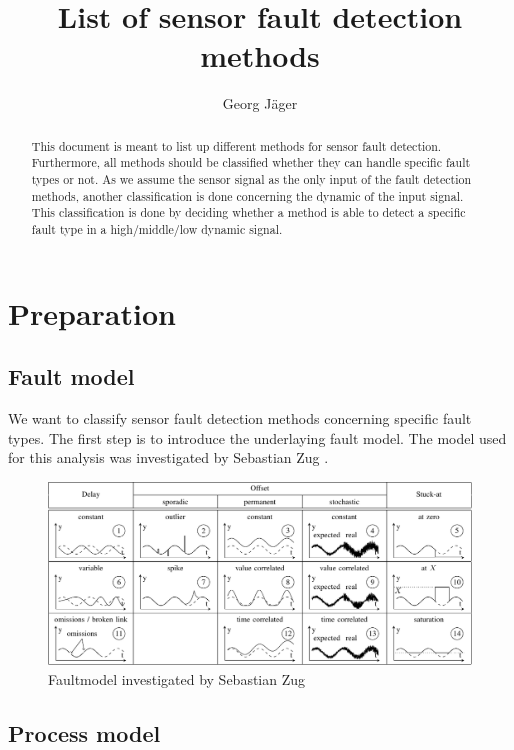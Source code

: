 \documentclass[a4paper,11pt]{article}
\title{List of sensor fault detection methods}
\author{Georg Jäger}
\begin{document}
\maketitle


\begin{abstract}
 This document is meant to list up different methods for sensor fault detection. Furthermore, all methods should be classified whether they can handle specific fault types or not. As we assume the sensor signal as the only input of the fault detection methods, another classification is done concerning the dynamic of the input signal. This classification is done by deciding whether a method is able to detect a specific fault type in a high/middle/low dynamic signal. 
\end{abstract}

\tableofcontents
\section{Preparation}
 
\subsection{Fault model}  
  We want to classify sensor fault detection methods concerning specific fault types. The first step is to introduce the underlaying fault model. The model used for this analysis was investigated by Sebastian Zug \cite{Z11}.
  
  
 \begin{figure}[ht]
	\centering
  \includegraphics[scale=0.7]{faultmodel.pdf}
	\caption{Faultmodel investigated by Sebastian Zug}
	\label{fig:faultmodel}
\end{figure}



\subsection{Process model}
\end{document}
